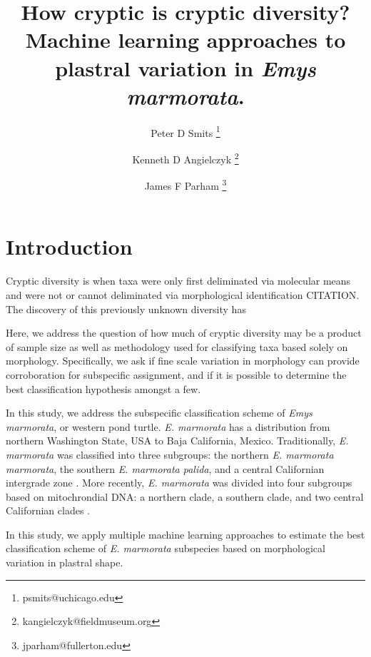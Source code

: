 \documentclass[12pt]{article}\usepackage{graphicx, color}
\title{How cryptic is cryptic diversity? Machine learning approaches to plastral variation in \textit{Emys marmorata}.}
\author[1]{Peter D Smits \thanks{psmits@uchicago.edu}}
\author[2]{Kenneth D Angielczyk \thanks{kangielczyk@fieldmuseum.org}}
\author[3]{James F Parham \thanks{jparham@fullerton.edu}}
\affil[1]{Committee on Evolution Biology, University of Chicago}
\affil[2]{Department of Geology, Field Museum of Natural History}
\affil[3]{Department of Geological Sciences, California State University -- Fullerton}
\begin{document}
\maketitle

\linenumbers
\modulolinenumbers[2]

\begin{abstract}

\end{abstract}

\section{Introduction}

Cryptic diversity is when taxa were only first deliminated via molecular means and were not or cannot deliminated via morphological identification CITATION. The discovery of this previously unknown diversity has
%

Here, we address the question of how much of cryptic diversity may be a product of sample size as well as methodology used for classifying taxa based solely on morphology. Specifically, we ask if fine scale variation in morphology can provide corroboration for subspecific assignment, and if it is possible to determine the best classification hypothesis amongst a few.

In this study, we address the subspecific classification scheme of \textit{Emys marmorata}, or western pond turtle. \textit{E. marmorata} has a distribution from northern Washington State, USA to Baja California, Mexico.
Traditionally, \textit{E. marmorata} was classified into three subgroups: the northern \textit{E. marmorata marmorata}, the southern \textit{E. marmorata palida}, and a central Californian intergrade zone \citep{Seeliger1945}. More recently, \textit{E. marmorata} was divided into four subgroups based on mitochrondial DNA: a northern clade, a southern clade, and two central Californian clades \citep{Spinks2005,Spinks2010}.

In this study, we apply multiple machine learning approaches to estimate the best classification scheme of \textit{E. marmorata} subspecies based on morphological variation in plastral shape. 
\end{document}
